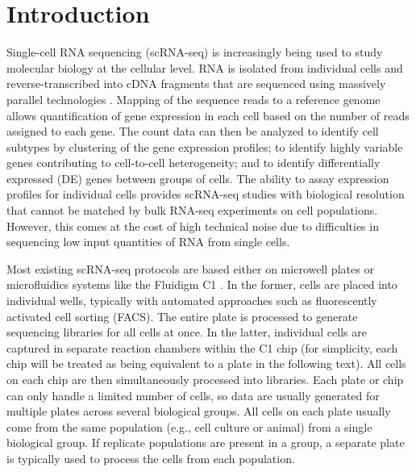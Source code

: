 \documentclass[oupdraft]{bio}
\begin{document}
\newcommand{\suppsimulation}{1}
\newcommand{\suppimplementation}{2}
\newcommand{\suppmeanvar}{3}
\newcommand{\supphiddenvar}{4}
\newcommand{\suppnorm}{2.2}

\newcommand{\suppparamsim}{S1}
\newcommand{\suppfailsim}{S2}
\newcommand{\suppokaysim}{S3}
\newcommand{\supppowerroc}{S4}
\newcommand{\supppowerfdr}{S5}
\newcommand{\suppswapped}{S6}
\newcommand{\supprealrank}{S7}
\newcommand{\suppexpprof}{S8}

\section{Introduction}
Single-cell RNA sequencing (scRNA-seq) is increasingly being used to study molecular biology at the cellular level.
RNA is isolated from individual cells and reverse-transcribed into cDNA fragments that are sequenced using massively parallel technologies \citep{stegle2015computational}.
Mapping of the sequence reads to a reference genome allows quantification of gene expression in each cell based on the number of reads assigned to each gene.
The count data can then be analyzed to identify cell subtypes by clustering of the gene expression profiles;
    to identify highly variable genes contributing to cell-to-cell heterogeneity;
    and to identify differentially expressed (DE) genes between groups of cells.
The ability to assay expression profiles for individual cells provides scRNA-seq studies with biological resolution that cannot be matched by bulk RNA-seq experiments on cell populations.
However, this comes at the cost of high technical noise due to difficulties in sequencing low input quantities of RNA from single cells.

Most existing scRNA-seq protocols are based either on microwell plates \citep{picelli2014full} or microfluidics systems like the Fluidigm C1 \citep{pollen2014low}.
In the former, cells are placed into individual wells, typically with automated approaches such as fluorescently activated cell sorting (FACS).
The entire plate is processed to generate sequencing libraries for all cells at once.
In the latter, individual cells are captured in separate reaction chambers within the C1 chip 
    (for simplicity, each chip will be treated as being equivalent to a plate in the following text).
All cells on each chip are then simultaneously processed into libraries.
Each plate or chip can only handle a limited number of cells, so data are usually generated for multiple plates across several biological groups. 
All cells on each plate usually come from the same population (e.g., cell culture or animal) from a single biological group.
If replicate populations are present in a group, a separate plate is typically used to process the cells from each population.
\end{document}
